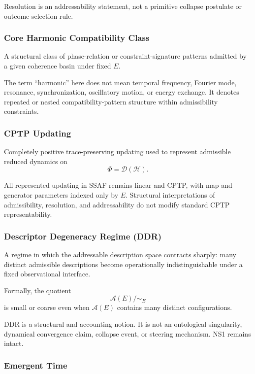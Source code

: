 \documentclass[aps,prx,onecolumn,11pt]{revtex4-2}
\theoremstyle{plain}
\theoremstyle{definition}
\theoremstyle{remark}
\begin{document}
Resolution is an addressability statement, not a primitive collapse
postulate or outcome-selection rule.

\subsubsection*{Core Harmonic Compatibility Class}

A structural class of phase-relation or constraint-signature patterns
admitted by a given coherence basin under fixed \(E\).

The term ``harmonic'' here does not mean temporal frequency, Fourier
mode, resonance, synchronization, oscillatory motion, or energy
exchange. It denotes repeated or nested compatibility-pattern structure
within admissibility constraints.

\subsubsection*{CPTP Updating}

Completely positive trace-preserving updating used to represent
admissible reduced dynamics on
\[
\Phi=\mathcal D(\mathcal H).
\]

All represented updating in SSAF remains linear and CPTP, with map and
generator parameters indexed only by \(E\). Structural interpretations
of admissibility, resolution, and addressability do not modify standard
CPTP representability.

\subsubsection*{Descriptor Degeneracy Regime (DDR)}
\label{gloss:DDR}

A regime in which the addressable description space contracts sharply:
many distinct admissible descriptions become operationally
indistinguishable under a fixed observational interface.

Formally, the quotient
\[
\mathcal A(E)/{\sim_E}
\]
is small or coarse even when \(\mathcal A(E)\) contains many distinct
configurations.

DDR is a structural and accounting notion. It is not an ontological
singularity, dynamical convergence claim, collapse event, or steering
mechanism. NS1 remains intact.

\subsubsection*{Emergent Time}
\end{document}
